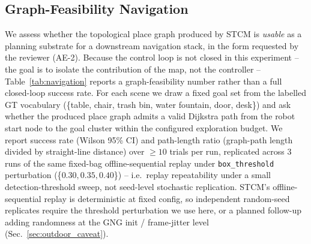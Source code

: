 \subsection{Graph-Feasibility Navigation}
\label{sec:navigation}

We assess whether the topological place graph produced by STCM is
\emph{usable} as a planning substrate for a downstream navigation
stack, in the form requested by the reviewer (AE-2). Because the
control loop is not closed in this experiment -- the goal is to
isolate the contribution of the map, not the controller --
Table~\ref{tab:navigation} reports a graph-feasibility number rather
than a full closed-loop success rate. For each scene we draw a fixed
goal set from the labelled GT vocabulary
(\{table, chair, trash bin, water fountain, door, desk\}) and ask
whether the produced place graph admits a valid Dijkstra path from
the robot start node to the goal cluster within the configured
exploration budget. We report success rate (Wilson 95\% CI) and
path-length ratio (graph-path length divided by straight-line
distance) over $\geq 10$ trials per run, replicated across $3$
runs of the same fixed-bag offline-sequential replay under
\texttt{box\_threshold} perturbation
(\{$0.30, 0.35, 0.40$\}) -- i.e.\ replay repeatability under a
small detection-threshold sweep, not seed-level stochastic
replication. STCM's offline-sequential replay is deterministic at
fixed config, so independent random-seed replicates require the
threshold perturbation we use here, or a planned follow-up adding
randomness at the GNG init / frame-jitter level (Sec.~\ref{sec:outdoor_caveat}).

